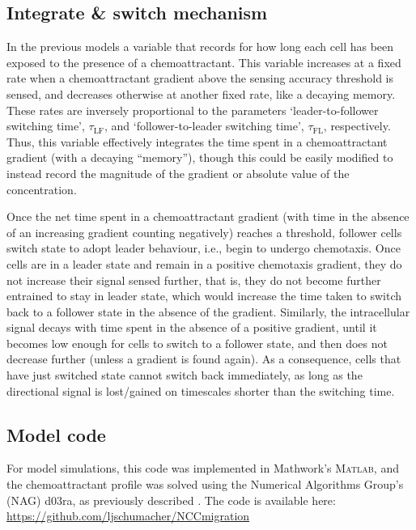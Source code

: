\documentclass[review]{elsarticle}
\begin{document}
         \subsection{Integrate \& switch mechanism\label{IntegrateAndSwitch}}
         In the previous models \cite{McLennan2015b,McLennan2017} a variable that records {for how long each cell has been exposed to the presence of a chemoattractant.} This variable increases at a fixed rate when a chemoattractant gradient above the sensing accuracy threshold is sensed, and decreases otherwise at another fixed rate, like a decaying memory. These rates are inversely proportional to the parameters `leader-to-follower switching time', $\tau_\mathrm{LF}$, and `follower-to-leader switching time', $\tau_\mathrm{FL}$, respectively. Thus, this variable effectively integrates the time spent in a chemoattractant gradient (with a decaying ``memory''), though this could be easily modified to instead record the magnitude of the gradient or absolute value of the concentration.
         
         Once the net time spent in a chemoattractant gradient (with time in the absence of an increasing gradient counting negatively) reaches a threshold, follower cells switch state to adopt leader behaviour, i.e., begin to undergo chemotaxis. Once cells are in a leader state and remain in a positive chemotaxis gradient, they do not increase their signal sensed further, that is, they do not become further entrained {to stay in leader state}, which would increase the time taken to switch back to a follower state in the absence of the gradient. Similarly, the intracellular signal decays with time spent in the absence of a positive gradient, until it becomes low enough for cells to switch to a follower state, and then does not decrease further (unless a gradient is found again). As a consequence, cells that have just switched state cannot switch back immediately, as long as the directional signal is lost/gained on timescales shorter than the switching time.
                  
         \subsection{Model code} \label{modelcode}
        For model simulations, this code was implemented in Mathwork's \textsc{Matlab}, and the chemoattractant profile was solved using the Numerical Algorithms Group's (NAG) d03ra, as previously described \cite{McLennan2012,McLennan2015,McLennan2015b}. The code is available here: \url{https://github.com/ljschumacher/NCCmigration}
            	
\end{document}
